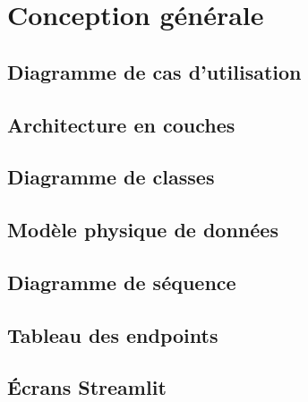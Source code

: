 \section{Conception générale}

\subsection{Diagramme de cas d'utilisation}

\subsection{Architecture en couches}

\subsection{Diagramme de classes}

\subsection{Modèle physique de données}

\subsection{Diagramme de séquence}

\subsection{Tableau des endpoints}

\subsection{Écrans Streamlit}
